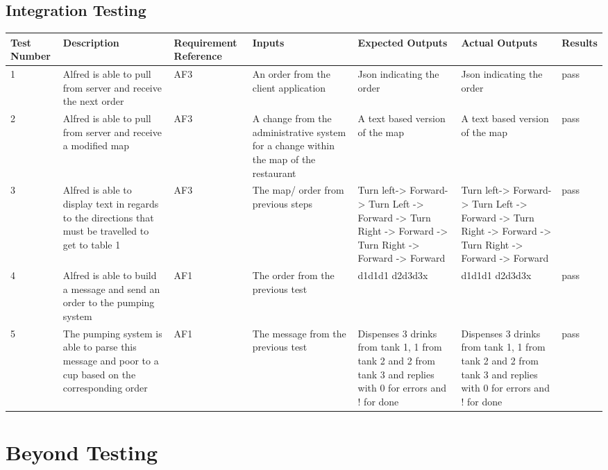 \documentclass [10pt]{article}
\begin{document}
\subsection {Integration Testing}

	\begin{longtable}{| p{} | p{} | p{} | p{} | p{} | p{} | p{} |}\hline 
	\rowcolor{tableCell}\textbf{Test Number} & \textbf{Description} & \textbf{Requirement Reference} & \textbf{Inputs} & \textbf{Expected Outputs} & \textbf{Actual Outputs}& \textbf{Results} \\ \hline
	1 &  Alfred is able to pull from server and receive the next order&  AF3 &  An order from the client application & Json indicating the order & Json indicating the order &  pass
	\\ \hline  
	2 &  Alfred is able to pull from server and receive a modified map &  AF3 & A change from the administrative system for a change within the map of the restaurant & A text based version of the map & A text based version of the map &  pass
	\\ \hline  
	3 &  Alfred is able to display text in regards to the directions that must be travelled to get to table 1 &  AF3 & The map/ order from previous steps & Turn left-> Forward-> Turn Left -> Forward -> Turn Right -> Forward -> Turn Right -> Forward -> Forward & Turn left-> Forward-> Turn Left -> Forward -> Turn Right -> Forward -> Turn Right -> Forward -> Forward &  pass
	\\ \hline  
	4 &  Alfred is able to build a message and send an order to the pumping system &  AF1 & The order from the previous test & d1d1d1 d2d3d3x & d1d1d1 d2d3d3x &  pass
	\\ \hline 
	5 &  The pumping system is able to parse this message and poor to a cup based on the corresponding order &  AF1 & The message from the previous test & Dispenses 3 drinks from tank 1, 1 from tank 2 and 2 from tank 3 and replies with 0 for errors and ! for done & Dispenses 3 drinks from tank 1, 1 from tank 2 and 2 from tank 3 and replies with 0 for errors and ! for done &  pass
	\\ \hline 
\end{longtable}

\pagebreak

\section {Beyond Testing}
\end{document}
